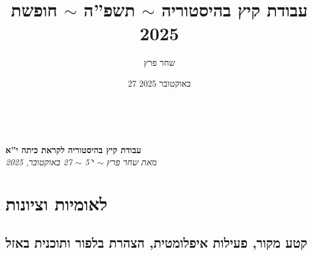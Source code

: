 \documentclass[a4paper]{article}
\author{שחר פרץ}
\title{עבודת קיץ בהיסטוריה $\sim$ תשפ''ה $\sim$ חופשת 2025}
\date{27 באוקטובר 2025}
\newcommand\name{עבודת קיץ בהיסטוריה לקראת כיתה י''א}
\begin{document}
	\renewcommand{\footrule}{\rule{\linewidth-19pt}{0.25pt}\vspace{-5pt}}
	\thispagestyle{empty}
	\,\! %
	
	{\vspace{0.5\textheight-2em} 
		{
			\begin{center} 
				{
					\textbf{{\name}
					} \\ 
					\textit{מאת שחר פרץ $\sim$ י'5 $\sim$ 27 באוקטובר, 2025}}
			\end{center}
		}
	}
	
	\newpage
	
	
	\section{לאומיות וציונות}
	\subsection{קטע מקור, פעילות איפלומטית, הצהרת בלפור ותוכנית באזל}
\end{document}
